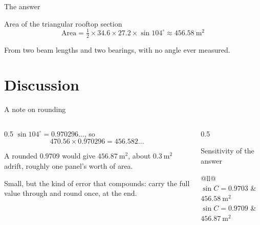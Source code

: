 \documentclass[11pt]{beamer}
\begin{document}
\begin{frame}{The answer}
  \begin{alertblock}{Area of the triangular rooftop section}
    \begin{equation*}
      \text{Area} = \tfrac12 \times 34.6 \times 27.2 \times \sin 104^\circ
                  \approx 456.58\ \text{m}^2
    \end{equation*}
  \end{alertblock}
  \vfill
  \begin{center}
    From two beam lengths and two bearings, with no angle ever measured.
  \end{center}
  \vfill
\end{frame}

\section{Discussion}

\begin{frame}{A note on rounding}
  \begin{columns}[T]
    \begin{column}{0.5\textwidth}
      \small
      $\sin 104^\circ = 0.970296\ldots$, so
      \[470.56 \times 0.970296 = 456.582\ldots\]

      A rounded $0.9709$ would give $456.87\ \text{m}^2$, about
      $0.3\ \text{m}^2$ adrift, roughly \alert{one panel's worth} of area.
      \medskip

      Small, but the kind of error that compounds: carry the full value
      through and round once, at the end.
    \end{column}
    \begin{column}{0.5\textwidth}
      \begin{block}{Sensitivity of the answer}
        \small
        \begin{tabular}{@{}ll@{}}
          \midrule
          $\sin C = 0.9703$ & $456.58\ \text{m}^2$\\
          $\sin C = 0.9709$ & $456.87\ \text{m}^2$\\
          \midrule
          \\
        \end{tabular}
      \end{block}
    \end{column}
  \end{columns}
\end{frame}
\end{document}
